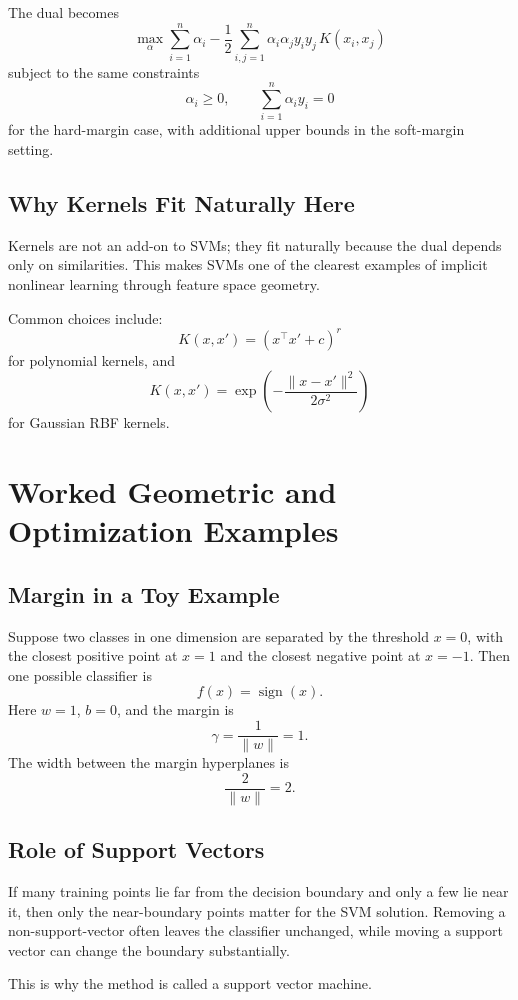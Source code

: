 The dual becomes
\[
\max_{\alpha}
\sum_{i=1}^n \alpha_i
-
\frac12\sum_{i,j=1}^n \alpha_i\alpha_j y_i y_j\, K(x_i,x_j)
\]
subject to the same constraints
\[
\alpha_i\ge 0,
\qquad
\sum_{i=1}^n \alpha_i y_i=0
\]
for the hard-margin case, with additional upper bounds in the soft-margin setting.

\subsection{Why Kernels Fit Naturally Here}

Kernels are not an add-on to SVMs; they fit naturally because the dual depends only on similarities. This makes SVMs one of the clearest examples of implicit nonlinear learning through feature space geometry.

Common choices include:
\[
K(x,x')=(x^\top x' + c)^r
\]
for polynomial kernels, and
\[
K(x,x')=\exp\!\left(-\frac{\|x-x'\|^2}{2\sigma^2}\right)
\]
for Gaussian RBF kernels.

\section{Worked Geometric and Optimization Examples}

\subsection{Margin in a Toy Example}

Suppose two classes in one dimension are separated by the threshold $x=0$, with the closest positive point at $x=1$ and the closest negative point at $x=-1$. Then one possible classifier is
\[
f(x)=\operatorname{sign}(x).
\]
Here $w=1$, $b=0$, and the margin is
\[
\gamma=\frac{1}{\|w\|}=1.
\]
The width between the margin hyperplanes is
\[
\frac{2}{\|w\|}=2.
\]

\subsection{Role of Support Vectors}

If many training points lie far from the decision boundary and only a few lie near it, then only the near-boundary points matter for the SVM solution. Removing a non-support-vector often leaves the classifier unchanged, while moving a support vector can change the boundary substantially.

This is why the method is called a support vector machine.

